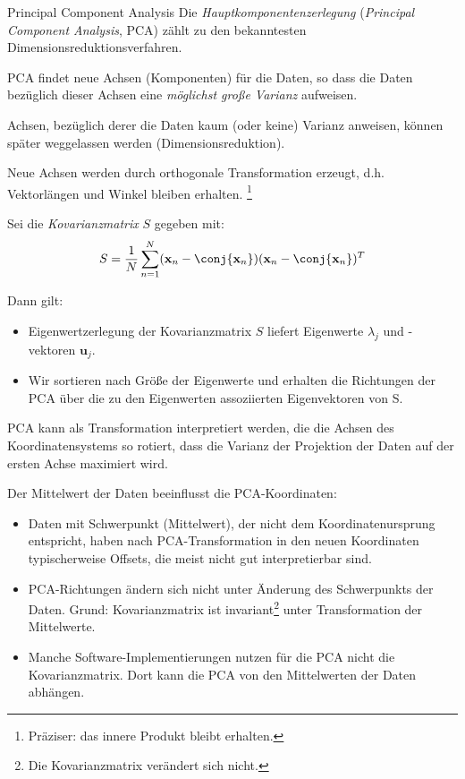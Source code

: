 \begin{defi}{Principal Component Analysis}
    Die \emph{Hauptkomponentenzerlegung} (\emph{Principal Component Analysis}, PCA) zählt zu den bekanntesten Dimensionsreduktionsverfahren.

    PCA findet neue Achsen (Komponenten) für die Daten, so dass die Daten bezüglich dieser Achsen eine \emph{möglichst große Varianz} aufweisen.

    Achsen, bezüglich derer die Daten kaum (oder keine) Varianz anweisen, können später weggelassen werden (Dimensionsreduktion).

    Neue Achsen werden durch orthogonale Transformation erzeugt, d.h. Vektorlängen und Winkel bleiben erhalten.
    \footnote{
        Präziser: das innere Produkt bleibt erhalten.
    }

    Sei die \emph{Kovarianzmatrix} $S$ gegeben mit:
    \[
        S = \frac{1}{N} \sum_{n=1}^N (\mathbf{x}_n - \conj{\mathbf{x}_n}) (\mathbf{x}_n - \conj{\mathbf{x}_n})^T
    \]

    Dann gilt:
    \begin{itemize}
        \item Eigenwertzerlegung der Kovarianzmatrix $S$ liefert Eigenwerte $\lambda_j$ und -vektoren $\mathbf{u}_j$.
        \item Wir sortieren nach Größe der Eigenwerte und erhalten die Richtungen der PCA über die zu den Eigenwerten assoziierten Eigenvektoren von S.
    \end{itemize}

    PCA kann als Transformation interpretiert werden, die die Achsen des Koordinatensystems so rotiert, dass die Varianz der Projektion der Daten auf der ersten Achse maximiert wird.

    Der Mittelwert der Daten beeinflusst die PCA-Koordinaten:
    \begin{itemize}
        \item Daten mit Schwerpunkt (Mittelwert), der nicht dem Koordinatenursprung entspricht, haben nach PCA-Transformation in den neuen Koordinaten typischerweise Offsets, die meist nicht gut interpretierbar sind.
        \item PCA-Richtungen ändern sich nicht unter Änderung des Schwerpunkts der Daten. Grund: Kovarianzmatrix ist invariant\footnote{Die Kovarianzmatrix verändert sich nicht.} unter Transformation der Mittelwerte.
        \item Manche Software-Implementierungen nutzen für die PCA nicht die Kovarianzmatrix. Dort kann die PCA von den Mittelwerten der Daten abhängen.
    \end{itemize}


\end{defi}
